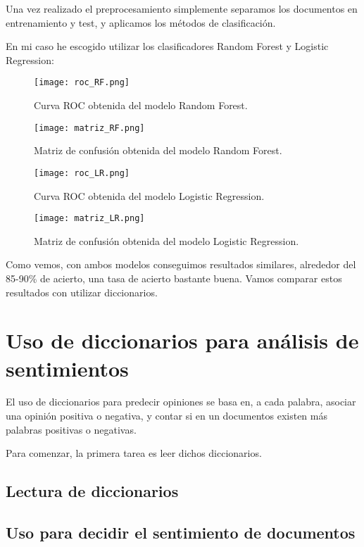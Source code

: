 Una vez realizado el preprocesamiento simplemente separamos los documentos en entrenamiento y test, y aplicamos los métodos de clasificación.

En mi caso he escogido utilizar los clasificadores Random Forest y Logistic Regression:

\begin{figure}[H]
	\centering
	\texttt{[image: roc\_RF.png]}
	\caption{Curva ROC obtenida del modelo Random Forest.}
	\label{fig:roc_RF}
\end{figure}

\begin{figure}[H]
	\centering
	\texttt{[image: matriz\_RF.png]}
	\caption{Matriz de confusión obtenida del modelo Random Forest.}
	\label{fig:matriz_RF}
\end{figure}

\begin{figure}[H]
	\centering
	\texttt{[image: roc\_LR.png]}
	\caption{Curva ROC obtenida del modelo Logistic Regression.}
	\label{fig:roc_LR}
\end{figure}

\begin{figure}[H]
	\centering
	\texttt{[image: matriz\_LR.png]}
	\caption{Matriz de confusión obtenida del modelo Logistic Regression.}
	\label{fig:matriz_RL}
\end{figure}

Como vemos, con ambos modelos conseguimos resultados similares, alrededor del 85-90\% de acierto, una tasa de acierto bastante buena. Vamos comparar estos resultados con utilizar diccionarios.


\section{Uso de diccionarios para análisis de sentimientos}

El uso de diccionarios para predecir opiniones se basa en, a cada palabra, asociar una opinión positiva o negativa, y contar si en un documentos existen más palabras positivas o negativas.

Para comenzar, la primera tarea es leer dichos diccionarios.

\subsection{Lectura de diccionarios}

\subsection{Uso para decidir el sentimiento de documentos}


